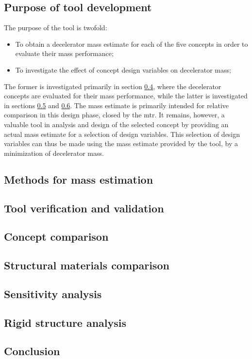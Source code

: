 \subsection{Purpose of tool development}\label{sec:strucpurp}
The purpose of the tool is twofold:
\begin{itemize}
\item To obtain a decelerator mass estimate for each of the five concepts in order to evaluate their mass performance;
\item To investigate the effect of concept design variables on decelerator mass;
\end{itemize}
The former is investigated primarily in section \ref{sec:struccc}, where the decelerator concepts are evaluated for their mass performance, while the latter is investigated in sections \ref{sec:strucmat} and \ref{sec:strucsens}. The mass estimate is primarily intended for relative comparison in this design phase, closed by the \acrfull{mtr}. It remains, however, a valuable tool in analysis and design of the selected concept by providing an actual mass estimate for a selection of design variables. This selection of design variables can thus be made using the mass estimate provided by the tool, by a minimization of decelerator mass.

\subsection{Methods for mass estimation}\label{sec:strucmeth}

\subsection{Tool verification and validation}\label{sec:strucvv}

\subsection{Concept comparison}\label{sec:struccc}

\subsection{Structural materials comparison}\label{sec:strucmat}

\subsection{Sensitivity analysis}\label{sec:strucsens}

\subsection{Rigid structure analysis}\label{sec:rigid}   %

\subsection{Conclusion}\label{sec:strucconc}

